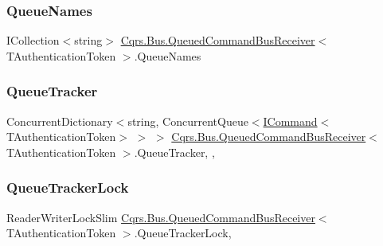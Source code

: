 \subsubsection{\texorpdfstring{Queue\+Names}{QueueNames}}
{\footnotesize\ttfamily I\+Collection$<$string$>$ \hyperlink{classCqrs_1_1Bus_1_1QueuedCommandBusReceiver}{Cqrs.\+Bus.\+Queued\+Command\+Bus\+Receiver}$<$ T\+Authentication\+Token $>$.Queue\+Names\hspace{0.3cm}{\ttfamily [get]}}

\mbox{\label{classCqrs_1_1Bus_1_1QueuedCommandBusReceiver_a2fc62989429929acd8ea66808a8c4a78}} 
\subsubsection{\texorpdfstring{Queue\+Tracker}{QueueTracker}}
{\footnotesize\ttfamily Concurrent\+Dictionary$<$string, Concurrent\+Queue$<$\hyperlink{interfaceCqrs_1_1Commands_1_1ICommand}{I\+Command}$<$T\+Authentication\+Token$>$ $>$ $>$ \hyperlink{classCqrs_1_1Bus_1_1QueuedCommandBusReceiver}{Cqrs.\+Bus.\+Queued\+Command\+Bus\+Receiver}$<$ T\+Authentication\+Token $>$.Queue\+Tracker\hspace{0.3cm}{\ttfamily [static]}, {\ttfamily [get]}, {\ttfamily [protected]}}

\mbox{\label{classCqrs_1_1Bus_1_1QueuedCommandBusReceiver_ac633e2d140fc90fab100acba4afa136b}} 
\subsubsection{\texorpdfstring{Queue\+Tracker\+Lock}{QueueTrackerLock}}
{\footnotesize\ttfamily Reader\+Writer\+Lock\+Slim \hyperlink{classCqrs_1_1Bus_1_1QueuedCommandBusReceiver}{Cqrs.\+Bus.\+Queued\+Command\+Bus\+Receiver}$<$ T\+Authentication\+Token $>$.Queue\+Tracker\+Lock\hspace{0.3cm}{\ttfamily [get]}, {\ttfamily [protected]}}

